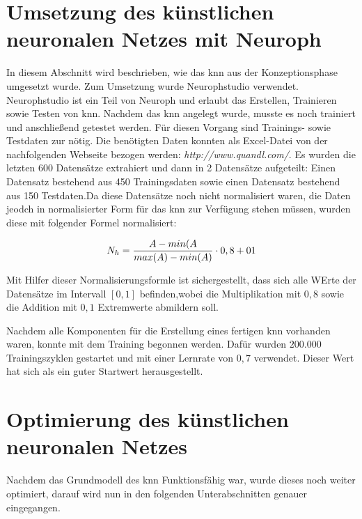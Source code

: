 \section{Umsetzung des künstlichen neuronalen Netzes mit Neuroph} %
\label{section:Umsetzung des künstlichen neuronalen Netzes mit Neuroph} %

In diesem Abschnitt wird beschrieben, wie das \acs{knn} aus der Konzeptionsphase umgesetzt wurde. Zum Umsetzung wurde Neurophstudio verwendet. Neurophstudio ist ein Teil von Neuroph und erlaubt das Erstellen, Trainieren sowie Testen von \acs{knn}.
Nachdem das \acs{knn} angelegt wurde, musste es noch trainiert und anschließend getestet werden. Für diesen Vorgang sind Trainings- sowie Testdaten zur nötig. Die benötigten Daten konnten als Excel-Datei von der nachfolgenden Webseite bezogen werden: 
\textit{http://www.quandl.com/}. Es wurden die letzten 600 Datensätze extrahiert und dann in 2 Datensätze aufgeteilt: Einen Datensatz bestehend aus 450 Trainingsdaten sowie einen Datensatz bestehend aus 150 Testdaten.Da diese Datensätze noch nicht normalisiert waren, die Daten jeodch in normalisierter Form für das \acs{knn} zur Verfügung stehen müssen, wurden diese mit folgender Formel normalisiert:

\begin{equation}\formelentry{Normalisierungsformel}
  N_h = \frac{A-min(A}{max(A)-min(A)}\cdot0,8+01
\end{equation}

Mit Hilfer dieser Normalisierungsformle ist sichergestellt, dass sich alle WErte der Datensätze im Intervall $[0,1]$ befinden,wobei die Multiplikation mit $0,8$ sowie die Addition mit $0,1$ Extremwerte abmildern soll.

Nachdem alle Komponenten für die Erstellung eines fertigen \acs{knn} vorhanden waren, konnte mit dem Training begonnen werden. Dafür wurden $200.000$ Trainingszyklen gestartet und mit einer Lernrate von $0,7$ verwendet. Dieser Wert hat sich als ein guter Startwert herausgestellt.


\section{Optimierung des künstlichen neuronalen Netzes}

Nachdem das Grundmodell des \acs{knn} Funktionsfähig war, wurde dieses noch weiter optimiert, darauf wird nun in den folgenden Unterabschnitten genauer eingegangen. 

\label{section:Optimierung des künstlischen neuronalen Netzes}
